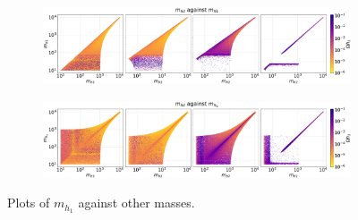 \documentclass[12pt]{article}
\begin{document}
\begin{figure}[H]
    \begin{subfigure}[b]{\columnwidth}
      \centering
      \includegraphics[width=1\columnwidth]{4plot/MD2_MD1.pdf}
    \end{subfigure}

    \begin{subfigure}[b]{\columnwidth}
      \centering
      \includegraphics[width=1\columnwidth]{4plot/MD2_MDP.pdf}
    \end{subfigure}
    \caption{Plots of $m_{h_1}$ against other masses.}
\end{figure}
\end{document}
